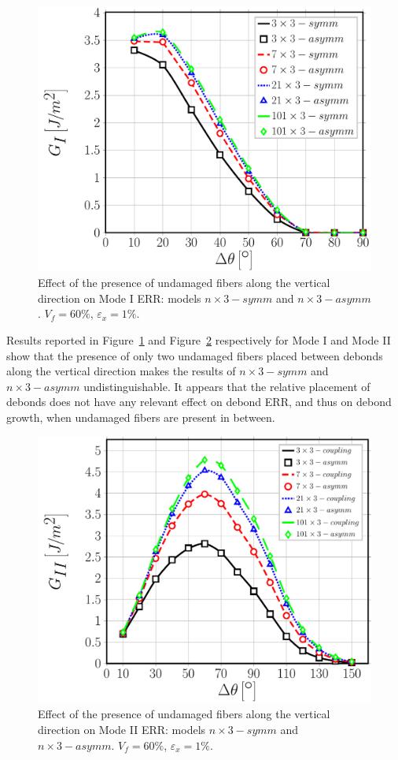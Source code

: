 \documentclass[smallextended]{svjour3}       %
\begin{document}
\begin{figure}[!h]
\centering
\includegraphics[width=\textwidth]{nxk-coupling-vf60-GI.pdf}
\caption{Effect of the presence of undamaged fibers along the vertical direction on Mode I ERR: models $n\times 3-symm$ and $n\times 3-asymm$. $V_{f}=60\%$, $\varepsilon_{x}=1\%$.}\label{fig:nxkGI}
\end{figure}

Results reported in Figure~\ref{fig:nxkGI} and Figure~\ref{fig:nxkGII} respectively for Mode I and Mode II show that the presence of only two undamaged fibers placed between debonds along the vertical direction makes the results of $n\times 3-symm$ and $n\times 3-asymm$ undistinguishable. It appears that the relative placement of debonds does not have any relevant effect on debond ERR, and thus on debond growth, when undamaged fibers are present in between.

\begin{figure}[!h]
\centering
\includegraphics[width=\textwidth]{nxk-coupling-vf60-GII.pdf}
\caption{Effect of the presence of undamaged fibers along the vertical direction on Mode II ERR: models $n\times 3-symm$ and $n\times 3-asymm$. $V_{f}=60\%$, $\varepsilon_{x}=1\%$.}\label{fig:nxkGII}
\end{figure}
\end{document}
